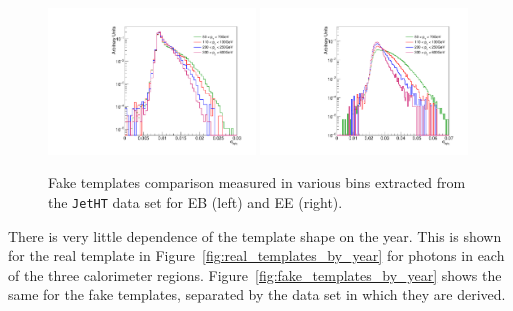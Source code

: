 \begin{figure}[!htbp]
\caption{Fake templates comparison measured in various \pt bins extracted from the \texttt{JetHT} data set for EB (left) and EE (right).}
\centering
\includegraphics[width=0.49\textwidth]{fig/faketemplatecompEB_jetht_2018.pdf}
\includegraphics[width=0.49\textwidth]{fig/faketemplatecompEE_jetht_2018.pdf}
\label{fig:fake_templates}
\end{figure}

There is very little dependence of the template shape on the year. This is shown for the real template in Figure~\ref{fig:real_templates_by_year} for photons in each of the three calorimeter regions. Figure~\ref{fig:fake_templates_by_year} shows the same for the fake templates, separated by the data set in which they are derived. 

